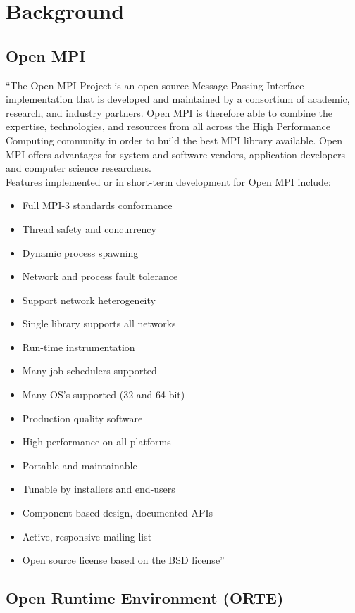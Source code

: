 \chapter{Background}
\label{sec:Background}

\section{Open MPI}
\label{sec:Background}
``The Open MPI Project is an open source Message Passing Interface implementation that is developed and maintained by a consortium of academic, research, and industry partners. Open MPI is therefore able to combine the expertise, technologies, and resources from all across the High Performance Computing community in order to build the best MPI library available. Open MPI offers advantages for system and software vendors, application developers and computer science researchers.\\
Features implemented or in short-term development for Open MPI include:
\begin{itemize}
  \item Full MPI-3 standards conformance
  \item Thread safety and concurrency
  \item Dynamic process spawning
  \item Network and process fault tolerance
  \item Support network heterogeneity
  \item Single library supports all networks
  \item Run-time instrumentation
  \item Many job schedulers supported
  \item Many OS's supported (32 and 64 bit)
  \item Production quality software
  \item High performance on all platforms
  \item Portable and maintainable
  \item Tunable by installers and end-users
  \item Component-based design, documented APIs
  \item Active, responsive mailing list
  \item Open source license based on the BSD license''~\cite{openmpi}
\end{itemize}
    
\section{Open Runtime Environment (ORTE)}
\label{sec:Background}

